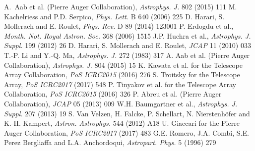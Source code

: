 \documentclass[twoside,12pt]{article}
\begin{document}
\begin{thebibliography}{99}
 A.~Aab et al. (Pierre Auger Collaboration), {\it Astrophys. J.} 802 (2015) 111
 M. Kachelriess and P.D. Serpico, {\it Phys. Lett.} B 640 (2006) 225 %
 D. Harari, S. Mollerach and E. Roulet, {\it Phys. Rev.} D 89 (2014) 123001 %
 P. Erdogdu et al., {\it Month. Not. Royal Astron. Soc.} 368 (2006) 1515 %
 J.P. Huchra et al., {\it Astrophys. J. Suppl.} 199 (2012) 26 %
 D. Harari, S. Mollerach and E. Roulet, {\it JCAP} 11 (2010) 033 %
 T.-P. Li and Y.-Q. Ma, {\it Astrophys. J.} 272 (1983) 317
 A. Aab et al. (Pierre Auger Collaboration), {\it Astrophys. J.} 804 (2015) 15
 K. Kawata et al. for the Telescope Array Collaboration, {\it PoS ICRC2015} (2016) 276
 S. Troitsky for the Telescope Array, {\it PoS ICRC2017} (2017) 548
 P. Tinyakov et al. for the Telescope Array Collaboration, {\it PoS ICRC2015} (2016) 326
 P. Abreu et al. (Pierre Auger Collaboration), {\it JCAP} 05 (2013) 009 %
 W.H. Baumgartner et al., {\it Astrophys. J. Suppl.}  207 (2013) 19
 S. Van Velzen, H. Falcke, P.  Schellart, N. Nierstenh\"ofer and K.-H. Kampert, {\it Astron. Astrophys.} 544 (2012) A18
 U. Giaccari for the Pierre Auger Collaboration,  {\it PoS ICRC2017} (2017) 483
 G.E. Romero, J.A. Combi, S.E. Perez Bergliaffa and L.A. Anchordoqui, {\it Astropart. Phys.} 5 (1996) 279 %

\end{thebibliography}
\end{document}
